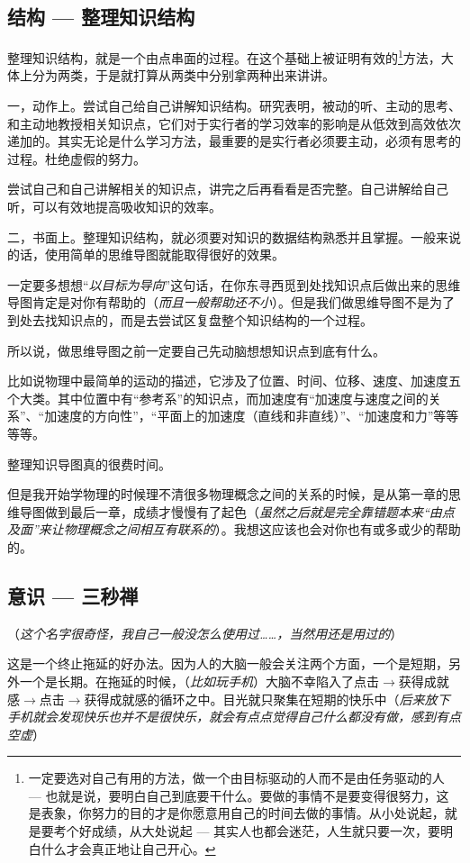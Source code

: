 \documentclass[b5paper]{ctexart}
\begin{document}
		\subsection{结构 --- 整理知识结构}
			整理知识结构，就是一个由点串面的过程。在这个基础上被证明有效的\footnote{一定要选对自己有用的方法，做一个由目标驱动的人而不是由任务驱动的人 --- 也就是说，要明白自己到底要干什么。要做的事情不是要变得很努力，这是表象，你努力的目的才是你愿意用自己的时间去做的事情。从小处说起，就是要考个好成绩，从大处说起 --- 其实人也都会迷茫，人生就只要一次，要明白什么才会真正地让自己开心。}方法，大体上分为两类，于是就打算从两类中分别拿两种出来讲讲。

			一，动作上。尝试自己给自己讲解知识结构。研究表明，被动的听、主动的思考、和主动地教授相关知识点，它们对于实行者的学习效率的影响是从低效到高效依次递加的。其实无论是什么学习方法，最重要的是实行者必须要主动，必须有思考的过程。杜绝虚假的努力。

			尝试自己和自己讲解相关的知识点，讲完之后再看看是否完整。自己讲解给自己听，可以有效地提高吸收知识的效率。

			二，书面上。整理知识结构，就必须要对知识的数据结构熟悉并且掌握。一般来说的话，使用简单的思维导图就能取得很好的效果。

			一定要多想想``\emph{以目标为导向}''这句话，在你东寻西觅到处找知识点后做出来的思维导图肯定是对你有帮助的（\emph{而且一般帮助还不小}）。但是我们做思维导图不是为了到处去找知识点的，而是去尝试区复盘整个知识结构的一个过程。

			所以说，做思维导图之前一定要自己先动脑想想知识点到底有什么。

			比如说物理中最简单的运动的描述，它涉及了位置、时间、位移、速度、加速度五个大类。其中位置中有``参考系''的知识点，而加速度有``加速度与速度之间的关系''、``加速度的方向性''，``平面上的加速度（直线和非直线）''、``加速度和力''等等等等。
		
			整理知识导图真的很费时间。

			但是我开始学物理的时候理不清很多物理概念之间的关系的时候，是从第一章的思维导图做到最后一章，成绩才慢慢有了起色（\emph{虽然之后就是完全靠错题本来``由点及面''来让物理概念之间相互有联系的}）。我想这应该也会对你也有或多或少的帮助的。

		\subsection{意识 --- 三秒禅}
			（\emph{这个名字很奇怪，我自己一般没怎么使用过\ldots\ldots，当然用还是用过的}）

			这是一个终止拖延的好办法。因为人的大脑一般会关注两个方面，一个是短期，另外一个是长期。在拖延的时候，（\emph{比如玩手机}）大脑不幸陷入了点击$\to$获得成就感$\to$点击$\to$获得成就感的循环之中。目光就只聚集在短期的快乐中（\emph{后来放下手机就会发现快乐也并不是很快乐，就会有点点觉得自己什么都没有做，感到有点空虚}）
\end{document}

